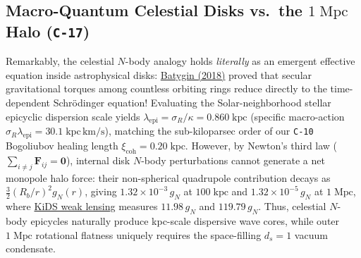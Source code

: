 \documentclass[11pt,letterpaper]{article}
\begin{document}
\subsection*{Macro-Quantum Celestial Disks vs.\ the $1\;\mathrm{Mpc}$ Halo (\texttt{C-17})}

Remarkably, the celestial $N$-body analogy holds \emph{literally} as an emergent effective equation inside astrophysical disks: \href{https://arxiv.org/abs/1803.01258}{Batygin (2018)} \cite{Batygin2018} proved that secular gravitational torques among countless orbiting rings reduce directly to the time-dependent Schr\"odinger equation! Evaluating the Solar-neighborhood stellar epicyclic dispersion scale yields $\lambda_{\mathrm{epi}} = \sigma_R / \kappa = 0.860\;\mathrm{kpc}$ (specific macro-action $\sigma_R \lambda_{\mathrm{epi}} = 30.1\;\mathrm{kpc\,km/s}$), matching the sub-kiloparsec order of our \texttt{C-10} Bogoliubov healing length $\xi_{\mathrm{coh}} = 0.20\;\mathrm{kpc}$. However, by Newton's third law ($\sum_{i\neq j}\mathbf{F}_{ij} = \mathbf{0}$), internal disk $N$-body perturbations cannot generate a net monopole halo force: their non-spherical quadrupole contribution decays as $\frac{3}{2}(R_b/r)^2 g_N(r)$, giving $1.32\times 10^{-3}\,g_N$ at $100\;\mathrm{kpc}$ and $1.32\times 10^{-5}\,g_N$ at $1\;\mathrm{Mpc}$, where \href{https://arxiv.org/abs/2406.09685}{KiDS weak lensing} \cite{Mistele2024} measures $11.98\,g_N$ and $119.79\,g_N$. Thus, celestial $N$-body epicycles naturally produce kpc-scale dispersive wave cores, while outer $1\;\mathrm{Mpc}$ rotational flatness uniquely requires the space-filling $d_s = 1$ vacuum condensate.
\end{document}
